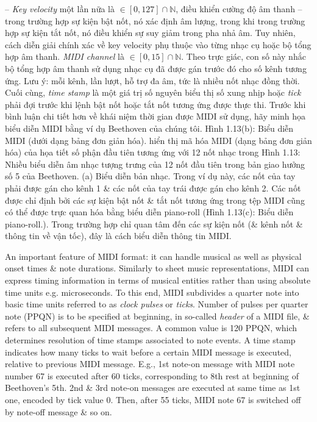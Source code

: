 \documentclass{article}
\begin{document}
\begin{itemize}
\begin{itemize}
\begin{itemize}
			-- {\it Key velocity} một lần nữa là $\in[0,127]\cap\mathbb{N}$, điều khiển cường độ âm thanh -- trong trường hợp sự kiện bật nốt, nó xác định âm lượng, trong khi trong trường hợp sự kiện tắt nốt, nó điều khiển sự suy giảm trong pha nhả âm. Tuy nhiên, cách diễn giải chính xác về key velocity phụ thuộc vào từng nhạc cụ hoặc bộ tổng hợp âm thanh. {\it MIDI channel} là $\in[0,15]\cap\mathbb{N}$. Theo trực giác, con số này nhắc bộ tổng hợp âm thanh sử dụng nhạc cụ đã được gán trước đó cho số kênh tương ứng. Lưu ý: mỗi kênh, lần lượt, hỗ trợ đa âm, tức là nhiều nốt nhạc đồng thời. Cuối cùng, {\it time stamp} là một giá trị số nguyên biểu thị số xung nhịp hoặc {\it tick} phải đợi trước khi lệnh bật nốt hoặc tắt nốt tương ứng được thực thi. Trước khi bình luận chi tiết hơn về khái niệm thời gian được MIDI sử dụng, hãy minh họa biểu diễn MIDI bằng ví dụ Beethoven của chúng tôi. {\sf Hình 1.13(b): Biểu diễn MIDI (dưới dạng bảng đơn giản hóa).} hiển thị mã hóa MIDI (dạng bảng đơn giản hóa) của họa tiết số phận đầu tiên tương ứng với 12 nốt nhạc trong {\sf Hình 1.13: Nhiều biểu diễn âm nhạc tượng trưng của 12 nốt đầu tiên trong bản giao hưởng số 5 của Beethoven. (a) Biểu diễn bản nhạc.} Trong ví dụ này, các nốt của tay phải được gán cho kênh 1 \& các nốt của tay trái được gán cho kênh 2. Các nốt được chỉ định bởi các sự kiện bật nốt \& tắt nốt tương ứng trong tệp MIDI cũng có thể được trực quan hóa bằng biểu diễn piano-roll ({\sf Hình 1.13(c): Biểu diễn piano-roll.}). Trong trường hợp chỉ quan tâm đến các sự kiện nốt (\& kênh nốt \& thông tin về vận tốc), đây là cách biểu diễn thông tin MIDI.
			
			An important feature of MIDI format: it can handle musical as well as physical onset times \& note durations. Similarly to sheet music representations, MIDI can express timing information in terms of musical entities rather than using absolute time units e.g. microseconds. To this end, MIDI subdivides a quarter note into basic time units referred to as {\it clock pulses} or {\it ticks}. Number of pulses per quarter note (PPQN) is to be specified at beginning, in so-called {\it header} of a MIDI file, \& refers to all subsequent MIDI messages. A common value is 120 PPQN, which determines resolution of time stamps associated to note events. A time stamp indicates how many ticks to wait before a certain MIDI message is executed, relative to previous MIDI message. E.g., 1st note-on message with MIDI note number 67 is executed after 60 ticks, corresponding to 8th rest at beginning of Beethoven's 5th. 2nd \& 3rd note-on messages are executed at same time as 1st one, encoded by tick value 0. Then, after 55 ticks, MIDI note 67 is switched off by note-off message \& so on.
			

\end{itemize}
\end{itemize}
\end{itemize}
\end{document}
